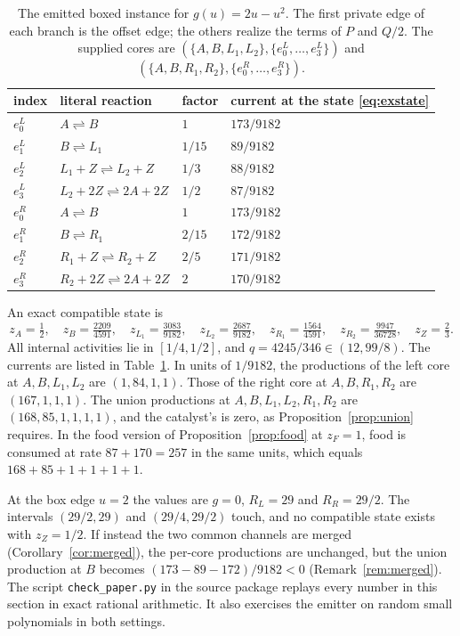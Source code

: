 \documentclass[11pt,a4paper]{article}
\theoremstyle{plain}
\theoremstyle{definition}
\theoremstyle{remark}
\newcommand{\rev}{\rightleftharpoons}
\begin{document}
\begin{table}[t]
\centering\small
\begin{tabular}{@{}llll@{}}\toprule
index & literal reaction & factor & current at the state \eqref{eq:exstate}\\\midrule
$e^L_0$ & $A\rev B$ & $1$ & $173/9182$\\
$e^L_1$ & $B\rev L_1$ & $1/15$ & $89/9182$\\
$e^L_2$ & $L_1+Z\rev L_2+Z$ & $1/3$ & $88/9182$\\
$e^L_3$ & $L_2+2Z\rev2A+2Z$ & $1/2$ & $87/9182$\\
$e^R_0$ & $A\rev B$ & $1$ & $173/9182$\\
$e^R_1$ & $B\rev R_1$ & $2/15$ & $172/9182$\\
$e^R_2$ & $R_1+Z\rev R_2+Z$ & $2/5$ & $171/9182$\\
$e^R_3$ & $R_2+2Z\rev2A+2Z$ & $2$ & $170/9182$\\\bottomrule
\end{tabular}
\caption{The emitted boxed instance for $g(u)=2u-u^2$. The first private edge of each branch is the offset edge; the others realize the terms of $P$ and $Q/2$. The supplied cores are $(\{A,B,L_1,L_2\},\{e^L_0,\ldots,e^L_3\})$ and $(\{A,B,R_1,R_2\},\{e^R_0,\ldots,e^R_3\})$.}
\label{tab:example}
\end{table}

An exact compatible state is
\begin{equation}\label{eq:exstate}
 z_A=\tfrac12,\quad z_B=\tfrac{2209}{4591},\quad z_{L_1}=\tfrac{3083}{9182},\quad z_{L_2}=\tfrac{2687}{9182},\quad z_{R_1}=\tfrac{1564}{4591},\quad z_{R_2}=\tfrac{9947}{36728},\quad z_Z=\tfrac23 .
\end{equation}
All internal activities lie in $[1/4,1/2]$, and $q=4245/346\in(12,99/8)$. The currents are listed in Table~\ref{tab:example}. In units of $1/9182$, the productions of the left core at $A,B,L_1,L_2$ are $(1,84,1,1)$. Those of the right core at $A,B,R_1,R_2$ are $(167,1,1,1)$. The union productions at $A,B,L_1,L_2,R_1,R_2$ are $(168,85,1,1,1,1)$, and the catalyst's is zero, as Proposition~\ref{prop:union} requires. In the food version of Proposition~\ref{prop:food} at $z_F=1$, food is consumed at rate $87+170=257$ in the same units, which equals $168+85+1+1+1+1$.

At the box edge $u=2$ the values are $g=0$, $R_L=29$ and $R_R=29/2$. The intervals $(29/2,29)$ and $(29/4,29/2)$ touch, and no compatible state exists with $z_Z=1/2$. If instead the two common channels are merged (Corollary~\ref{cor:merged}), the per-core productions are unchanged, but the union production at $B$ becomes $(173-89-172)/9182<0$ (Remark~\ref{rem:merged}). The script \texttt{check\_paper.py} in the source package replays every number in this section in exact rational arithmetic. It also exercises the emitter on random small polynomials in both settings.
\end{document}
